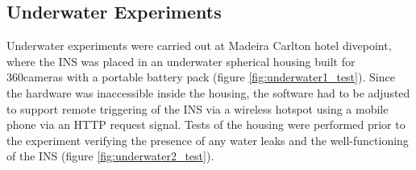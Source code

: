 \newpage

\subsection{Underwater Experiments}

Underwater experiments were carried out at Madeira Carlton hotel divepoint, where the INS was placed in an underwater spherical housing built for 360\circ cameras with a portable battery pack (figure \ref{fig:underwater1_test}). Since the hardware was inaccessible inside the housing, the software had to be adjusted to support remote triggering of the INS via a wireless hotspot using a mobile phone via an HTTP request signal. Tests of the housing were performed prior to the experiment verifying the presence of any water leaks and the well-functioning of the INS (figure \ref{fig:underwater2_test}).

